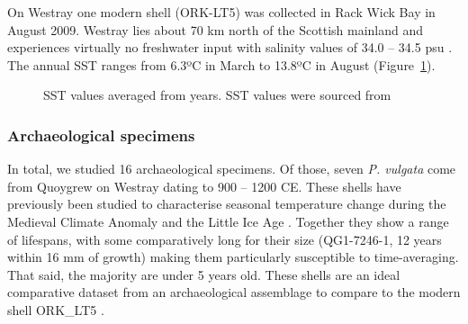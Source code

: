\documentclass[
  authoryear,
  preprint,
  3p]{elsarticle}
\begin{document}
On Westray one modern shell (ORK-LT5) was collected in Rack Wick Bay in
August 2009. Westray lies about 70 km north of the Scottish mainland and
experiences virtually no freshwater input with salinity values of 34.0
-- 34.5 psu \citep{Inall2009-ho}. The annual SST ranges from 6.3ºC in
March to 13.8ºC in August (Figure~\ref{fig-SSTs}).

\begin{figure}


\caption{\label{fig-SSTs}SST values averaged from years. SST values were
sourced from \citet{Good2020-nl}}

\end{figure}%

\subsubsection{Archaeological specimens}\label{archaeological-specimens}

In total, we studied 16 archaeological specimens. Of those, seven
\emph{P. vulgata} come from Quoygrew on Westray dating to 900 -- 1200
CE. These shells have previously been studied to characterise seasonal
temperature change during the Medieval Climate Anomaly and the Little
Ice Age \citep{Surge2012-ba}. Together they show a range of lifespans,
with some comparatively long for their size (QG1-7246-1, 12 years within
16 mm of growth) making them particularly susceptible to time-averaging.
That said, the majority are under 5 years old. These shells are an ideal
comparative dataset from an archaeological assemblage to compare to the
modern shell ORK\_LT5 \citep{Graniero2017-io}.
\end{document}
